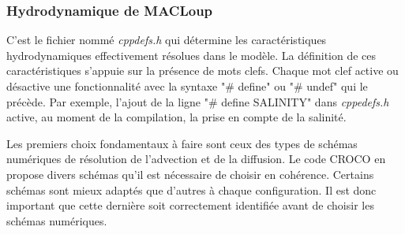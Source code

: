 \documentclass[10pt,a4paper,titlepage]{article}
\begin{document}
\subsubsection{Hydrodynamique de MACLoup}
\label{subsub:pysique_modele}
C'est le fichier nommé \textit{cppdefs.h} qui détermine les caractéristiques hydrodynamiques effectivement résolues dans le modèle.
La définition de ces caractéristiques s'appuie sur la présence de mots clefs.
Chaque mot clef active ou désactive une fonctionnalité avec la syntaxe "\# define"  ou "\# undef" qui le précède.
Par exemple, l'ajout de la ligne "\# define SALINITY" dans \textit{cppedefs.h} active, au moment de la compilation, la prise en compte de la salinité.



    Les premiers choix fondamentaux à faire sont ceux des types de schémas numériques de résolution de l'advection et de la diffusion.
    Le code CROCO en propose divers schémas qu'il est nécessaire de choisir en cohérence. %
    Certains schémas sont mieux adaptés que d'autres à chaque configuration.
    Il est donc important que cette dernière soit correctement identifiée avant de choisir les schémas numériques.
    
\end{document}
